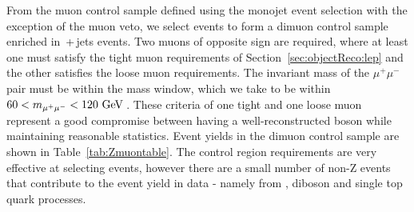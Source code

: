 From the muon control sample defined using the monojet event selection with the exception of the muon veto, we select events to form a dimuon control sample enriched in \zmumubr\,+\,jets events.
Two muons of opposite sign are required, where at least one must satisfy the tight muon requirements of Section~\ref{sec:objectReco:lep} and the other satisfies the loose muon requirements.
The invariant mass of the $\mu^{+}\mu^{-}$ pair must be within the \Z{} mass window, which we take to be within $60<m_{\mu^{+}\mu^{-}}<120~\mathrm{GeV}\,$. 
These criteria of one tight and one loose muon represent a good compromise between having a well-reconstructed \Z{} boson while maintaining reasonable statistics.
Event yields in the dimuon control sample are shown in Table~\ref{tab:Zmuontable}.
The control region requirements are very effective at selecting \zellell events, however there are a small number of non-Z events that contribute to the event yield in data - namely from \ttbar, diboson and single top quark processes.

